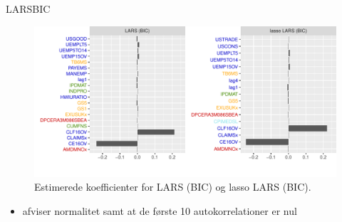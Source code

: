 \begin{frame}{LARS}{BIC}
\begin{figure}
 \includegraphics[width=1\linewidth, height=0.7\textheight]{slides/coef_plot_lars_bic.pdf}
 \caption{Estimerede koefficienter for LARS (BIC) og lasso LARS (BIC).}
 \end{figure}
 \begin{itemize}
\item afviser normalitet samt at de første 10 autokorrelationer er nul
\end{itemize}
\end{frame}


